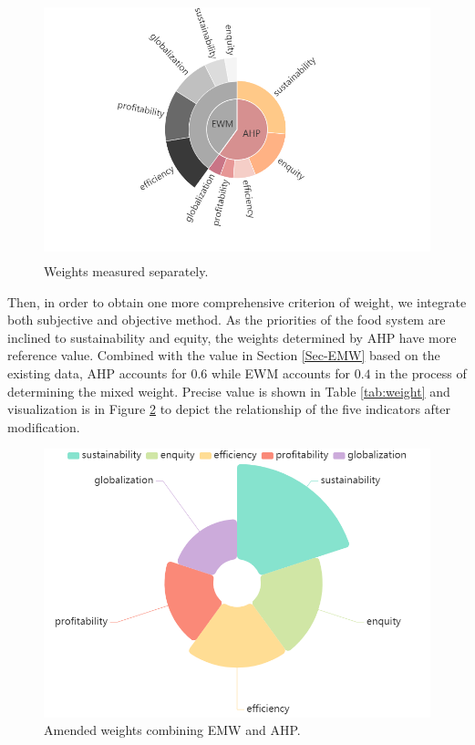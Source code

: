 \documentclass{mcmthesis}
\begin{document}
\begin{figure}[H]
    \centering
    \includegraphics[height=7.5cm]{echarts (11).png}
    \caption{Weights measured separately.}
    \label{fig:weight1}
\end{figure}

Then, in order to obtain one more comprehensive criterion of weight, we integrate both subjective and objective method. As the priorities of the food system are inclined to sustainability and equity, the weights determined by AHP have more reference value. Combined with the value in Section \ref{Sec-EMW} based on the existing data, AHP accounts for $0.6$ while EWM accounts for $0.4$ in the process of determining the mixed weight. Precise value is shown in Table \ref{tab:weight} and visualization is in Figure \ref{fig:weight2} to depict the relationship of the five indicators after modification.

\begin{figure}[H]
    \centering
    \includegraphics[height=7.cm]{echarts (8).png}
    \caption{Amended weights combining EMW and AHP.}
    \label{fig:weight2}
\end{figure}   
\end{document}
